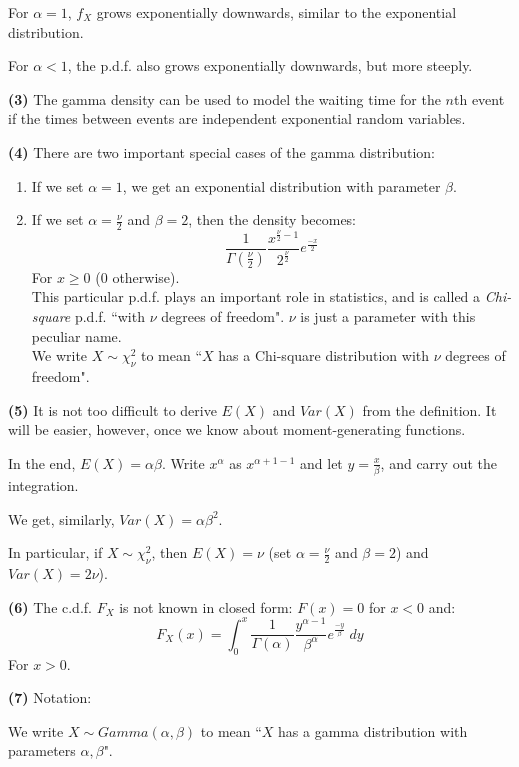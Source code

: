 \documentclass[12pt]{article}
\begin{document}
For $\alpha = 1$, $f_X$ grows exponentially downwards, similar to the exponential distribution.

For $\alpha < 1$, the p.d.f. also grows exponentially downwards, but more steeply.

\textbf{(3)}
The gamma density can be used to model the waiting time for the $n$th event if the times between events are independent exponential random variables.

\textbf{(4)}
There are two important special cases of the gamma distribution:
\begin{enumerate}
    \item If we set $\alpha = 1$, we get an exponential distribution with parameter $\beta$.
    \item If we set $\alpha = \frac{\nu}{2}$ and $\beta = 2$, then the density becomes:
        \[
            \frac{1}{\Gamma(\frac{\nu}{2})} \frac{x^{\frac{\nu}{2} - 1}}{2^{\frac{\nu}{2}}} e^{\frac{-x}{2}}
        \]
        For $x \geq 0$ (0 otherwise). \\
        This particular p.d.f. plays an important role in statistics, and is called a \emph{Chi-square} p.d.f. ``with $\nu$ degrees of freedom". $\nu$ is just a parameter with this peculiar name. \\
        We write $X \sim \chi_{\nu}^2$ to mean ``$X$ has a Chi-square distribution with $\nu$ degrees of freedom".
\end{enumerate}

\textbf{(5)}
It is not too difficult to derive $E(X)$ and $Var(X)$ from the definition. It will be easier, however, once we know about moment-generating functions.

In the end, $E(X) = \alpha \beta$. Write $x^{\alpha}$ as $x^{\alpha + 1 - 1}$ and let $y = \frac{x}{\beta}$, and carry out the integration.

We get, similarly, $Var(X) = \alpha \beta^2$.

In particular, if $X \sim \chi_{\nu}^2$, then $E(X) = \nu$ (set $\alpha = \frac{\nu}{2}$ and $\beta = 2$) and $Var(X) = 2 \nu$).

\textbf{(6)}
The c.d.f. $F_X$ is not known in closed form: $F(x) = 0$ for $x<0$ and:
\[
    F_X (x) = \int_0^x \frac{1}{\Gamma(\alpha)} \frac{y^{\alpha - 1}}{\beta^{\alpha}} e^{\frac{-y}{\beta}} \; dy
\]
For $x>0$.

\textbf{(7)} Notation:

We write $X \sim Gamma(\alpha, \beta)$ to mean ``$X$ has a gamma distribution with parameters $\alpha, \beta$".
\end{document}
